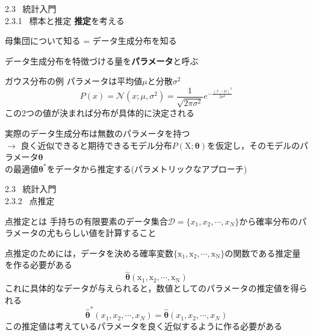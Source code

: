 \documentclass[dvipdfmx,8pt]{beamer}
\begin{document}
  \begin{frame}[t]{2.3 \ 統計入門 \\ \normalsize{2.3.1 \ 標本と推定}}
    \textbf{推定}を考える\\
    \begin{center}
      母集団について知る = データ生成分布を知る
    \end{center}
    データ生成分布を特徴づける量を\textbf{パラメータ}と呼ぶ
    \begin{exampleblock}{ガウス分布の例}
      パラメータは平均値$\mu$と分散$\sigma^2$
      \begin{equation*}
        P(x)=\mathcal{N}(x;\mu,\sigma^2)=\frac{1}{\sqrt{2\pi \sigma^2}}e^{-\frac{(x-\mu)^2}{2\sigma^2}}
      \end{equation*}
      この2つの値が決まれば分布が具体的に決定される
    \end{exampleblock}
    実際のデータ生成分布は無数のパラメータを持つ\\
    $\rightarrow$ 良く近似できると期待できるモデル分布$P(\mathrm{X};\bm{\theta})$を仮定し，そのモデルのパラメータ$\bm{\theta}$\\の最適値$\bm{\theta}^*$をデータから推定する(パラメトリックなアプローチ)
  \end{frame}

  \begin{frame}[t]{2.3 \ 統計入門 \\ \normalsize{2.3.2 \ 点推定}}
    \begin{block}{点推定とは}
      手持ちの有限要素のデータ集合$\mathcal{D}=\{x_1,x_2,\cdots,x_N\}$から確率分布のパラメータの尤もらしい値を計算すること
    \end{block}
    点推定のためには，データを決める確率変数$\{\mathrm{x_1},\mathrm{x_2},\cdots,\mathrm{x_N}\}$の関数である推定量を作る必要がある
    \begin{equation*}
      \hat{\bm{\theta}}(\mathrm{x_1},\mathrm{x_2},\cdots,\mathrm{x_N})
    \end{equation*}
    これに具体的なデータが与えられると，数値としてのパラメータの推定値を得られる
    \begin{equation*}
      \hat{\bm{\theta}}^*(x_1,x_2,\cdots,x_N) = \hat{\bm{\theta}}(x_1,x_2,\cdots,x_N)
    \end{equation*}
    この推定値は考えているパラメータを良く近似するように作る必要がある
  \end{frame}
\end{document}
